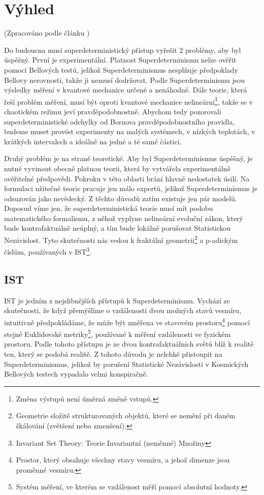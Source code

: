 \section{Výhled}
(Zpracováno podle článku \cite{supdet:rethink})

Do budoucna musí superdeterministický přístup vyřešit 2 problémy, aby byl úspěšný. První je experimentální. Platnost Superdeterminismu nelze ověřit pomocí Bellových testů, jelikož Superdeterminismus nesplňuje předpoklady Bellovy nerovnosti, takže ji nemusí dodržovat. Podle Superdeterminismu jsou výsledky měření v kvantové mechanice určené a nenáhodné. Dále teorie, která řeší problém měření, musí být oproti kvantové mechanice nelineární\footnote[17]{Změna výstupů není úměrná změně vstupů.}, takže se v chaotickém režimu jeví pravděpodobnostně. Abychom tedy pozorovali superdeterministické odchylky od Bornova pravděpodobnostního pravidla, budeme muset provést experimenty na malých systémech, v nízkých teplotách, v krátkých intervalech a ideálně na jedné a té samé částici. 

Druhý problém je na straně teoretické. Aby byl Superdeterminismus úspěšný, je nutné vyvinout obecně platnou teorii, která by vytvářela experimentálně ověřitelné předpovědi. Pokroku v této oblasti brání hlavně nedostatek úsilí. Na formulaci užitečné teorie pracuje jen málo expertů, jelikož Superdeterminismus je odsuzován jako nevědecký. Z těchto důvodů zatím existuje jen pár  modelů. Doposud víme jen, že superdeterministická teorie musí mít podobu matematického formalismu, z něhož vyplyne nelineární evoluční zákon, který bude kontrafaktuálně neúplný, a tím bude lokálně porušovat Statistickou Nezávislost. Tyto skutečnosti nás vedou k fraktální geometrii\footnote[18]{Geometrie složitě strukturovaných objektů, které se nemění při daném škálování (zvětšení nebo zmenšení).} a p-adickým číslům, používaných v IST\footnote[19]{Invariant Set Theory: Teorie Invariantní (neměnné) Množiny}. 

\subsection{IST}
IST je jedním z nejslibnějších přístupů k Superdeterminismu. Vychází ze skutečnosti, že když přemýšlíme o vzdálenosti dvou možných stavů vesmíru, intuitivně předpokládáme, že může být změřena ve stavovém prostoru\footnote[20]{Prostor, který obsahuje všechny stavy vesmíru, a jehož dimenze jsou proměnné vesmíru.} pomocí stejné Euklidovské metriky\footnote[21]{Systém měření, ve kterém se vzdálenost měří pomocí absolutní hodnoty.}, používané k měření vzdálenosti ve fyzickém prostoru. Podle tohoto přístupu je ze dvou kontrafaktuálních světů blíž k realitě ten, který se  podobá realitě. Z tohoto důvodu je nelehké přistoupit na Superdeterminismus, jelikož by porušení Statistické Nezávislosti v Kosmických Bellových testech vypadalo velmi konspiračně.

